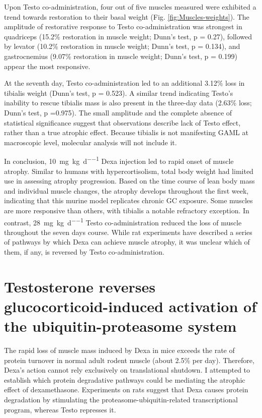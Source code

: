 \documentclass[12pt,english]{report}\usepackage[]{graphicx}\usepackage[]{color}
\begin{document}
Upon Testo co-administration, four out of five muscles measured were
exhibited a trend towards restoration to their basal weight (Fig.
\ref{fig:Muscles-weights}). The amplitude of restorative response
to Testo co-administration was strongest in quadriceps (15.2\%
restoration in muscle weight; Dunn's test, p = 0.27),
followed by levator (10.2\%
restoration in muscle weight; Dunn's test, p = 0.134),
and gastrocnemius (9.07\%
restoration in muscle weight; Dunn's test, p = 0.199)
appear the most responsive.

At the seventh day, Testo co-administration led to an additional 3.12\%
loss in tibialis weight (Dunn's test, p = 0.523).
A similar trend indicating Testo's inability to rescue tibialis mass
is also present in the three-day data (2.63\%
loss; Dunn's test, p =0.975).
The small amplitude and the complete absence of statistical significance
suggest that observations describe lack of Testo effect, rather than
a true atrophic effect. Because tibialis is not manifesting GAML at
macroscopic level, molecular analysis will not include it.

In conclusion, \SI{10}{\milli\gram\per\kilo\gram\per\day} Dexa injection
led to rapid onset of muscle atrophy. Similar to humans with hypercortisolism,
total body weight had limited use in assessing atrophy progression.
Based on the time course of lean body mass and individual muscle changes,
the atrophy develops throughout the first week, indicating that this
murine model replicates chronic GC exposure. Some muscles are more
responsive than others, with tibialis a notable refractory exception.
In contrast, \SI{28}{\milli\gram\per\kilo\gram\per\day} Testo co-administration
reduced the loss of muscle throughout the seven days course. While
rat experiments have described a series of pathways by which Dexa
can achieve muscle atrophy, it was unclear which of them, if any,
is reversed by Testo co-administration.


\section{Testosterone reverses glucocorticoid-induced activation of the ubiquitin-proteasome
system}

The rapid loss of muscle mass induced by Dexa in mice exceeds the
rate of protein turnover in normal adult rodent muscle (about 2.5\%
per day\citep{millward1975skeletal-muscle}). Therefore, Dexa's action
cannot rely exclusively on translational shutdown. I attempted to
establish which protein degradative pathways could be mediating the
atrophic effect of dexamethasone. Experiments on rats suggest that
Dexa causes protein degradation by stimulating the proteasome-ubiquitin-related
transcriptional program, whereas Testo represses it.
\end{document}
